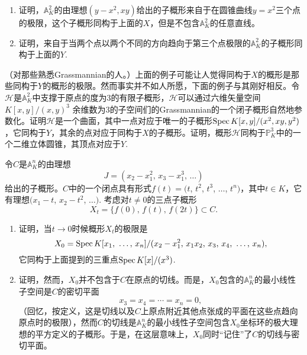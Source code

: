 \begin{exe}
	\begin{enumerate}[{(i)}]\setlength{\itemsep}{0pt}
		\item 证明，$\mathbb{A}_K^2$的由理想$(y-x^2,xy)$给出的子概形来自于在圆锥曲线$y=x^2$三个点的极限，这个子概形同构于上面的$X$，但是不包含$\mathbb{A}_K^2$的任意直线。


		\item 证明，来自于当两个点以两个不同的方向趋向于第三个点极限的$\mathbb{A}_K^2$的子概形同构于上面的$Y$.
	\end{enumerate}
\end{exe}

\begin{exe} （对那些熟悉Grassmannian的人。）上面的例子可能让人觉得同构于$X$的概形是那些同构于$Y$的概形的极限。然而事实并不如人所愿，下面的例子与其刚好相反。令$\mathscr{H}$是$\mathbb{A}_K^2$中支撑于原点的度为$3$的有限子概形，$\mathscr{H}$可以通过六维矢量空间$K[x,y]/(x,y)^3$ 余维数为$3$的子空间们的Grassmannian的一个闭子概形自然地参数化。证明$\mathscr{H}$是一个曲面，其中一点对应于唯一的子概形$\operatorname{Spec} K[x,y]/(x^2,xy,y^2)$，它同构于$Y$，其余的点对应于同构于$X$的子概形。证明，概形$\mathscr{H}$同构于$\mathbb{P}^3_K$中的一个二维立体圆锥，其顶点对应于$Y$.
\end{exe}

\begin{exe}
	令$C$是$\mathbb{A}_K^n$的由理想
	\[
	J=(x_2-x_1^2\text{, }x_3-x_1^3\text{, }\dots)
	\]
	给出的子概形。$C$中的一个闭点具有形式$f(t)=(t$, $t^2$, $t^3$, $\dots$, $t^n)$，其中$t\in K$，它有理想$(x_1-t$, $x_2-t^2$, $\dots)$. 考虑对$t\neq 0$的三点子概形
	\[
	X_t=\{f(0)\text{, }f(t)\text{, }f(2t)\}\subset C.
	\]

	\begin{enumerate}[{(a)}]\setlength{\itemsep}{0pt}
		\item 证明，当$t\to 0$时候概形$X_t$的极限是
		\[
		X_0=\operatorname{Spec} K[x_1\text{, }\dots\text{, }x_n]/(x_2-x_1^2\text{, }x_1x_2\text{, }x_3\text{, }x_4\text{, }\dots\text{, }x_n),
		\]
		它同构于上面提到的三重点$\operatorname{Spec} K[x]/(x^3)$.
		\item 证明，然而，$X_0$并不包含于$C$在原点的切线。而是，$X_0$包含的$\mathbb{A}_K^n$的最小线性子空间是$C$的密切平面
		\[
		x_3=x_4=\cdots=x_n=0,
		\]
		（回忆，按定义，这是切线以及$C$上原点附近其他点张成的平面在这些点趋向原点时的极限）\nottran，然而$C$的切线是$\mathbb{A}_K^n$的最小线性子空间包含$X_0$坐标环的极大理想的平方定义的子概形。于是，在这层意味上，$X_0$同时“记住”了$C$的切线与密切平面。
	\end{enumerate}
\end{exe}

